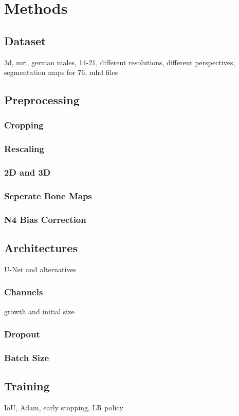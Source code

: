\section{Methods}

\subsection{Dataset}

3d, mri, german males, 14-21, different resolutions, different perspectives, segmentation maps for 76, mhd files

\subsection{Preprocessing}

\subsubsection{Cropping}
\subsubsection{Rescaling}
\subsubsection{2D and 3D}
\subsubsection{Seperate Bone Maps}
\subsubsection{N4 Bias Correction}

\subsection{Architectures}

U-Net and alternatives

\subsubsection{Channels}

growth and initial size

\subsubsection{Dropout}

\subsubsection{Batch Size}

\subsection{Training}

IoU, Adam, early stopping, LR policy

\newpage